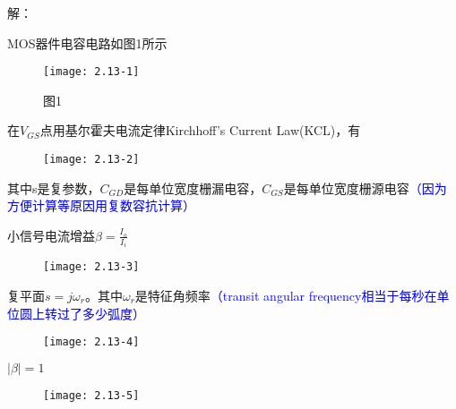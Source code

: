 






解：

\scalebox{3}{（a）}

MOS器件电容电路如图1所示

		\begin{figure}[H] %
	\begin{minipage}{\linewidth}
		\texttt{[image: 2.13-1]}
	\end{minipage}
	\caption*{图1} %
\end{figure}

在$V_{GS}$点用基尔霍夫电流定律Kirchhoff’s Current Law(KCL)，有

	\begin{figure}[H] %
	\begin{minipage}{\linewidth}
		\texttt{[image: 2.13-2]}
	\end{minipage}
\end{figure}

其中s是复参数‌，$C_{GD}$是每单位宽度栅漏电容，$C_{GS}$是每单位宽度栅源电容\textcolor{blue}{（因为方便计算等原因用复数容抗计算）}

小信号电流增益$\beta =\frac{I_o}{I_i}$


\begin{figure}[H] %
	\begin{minipage}{\linewidth}
		\texttt{[image: 2.13-3]}
	\end{minipage}
\end{figure}

复平面$s=j {\omega}_r$。其中${\omega}_r$是特征角频率\textcolor{blue}{（transit angular frequency相当于每秒在单位圆上转过了多少弧度）}


\begin{figure}[H] %
	\begin{minipage}{\linewidth}
		\texttt{[image: 2.13-4]}
	\end{minipage}
\end{figure}

$|\beta |=1$


\begin{figure}[H] %
	\begin{minipage}{\linewidth}
		\texttt{[image: 2.13-5]}
	\end{minipage}
\end{figure}

